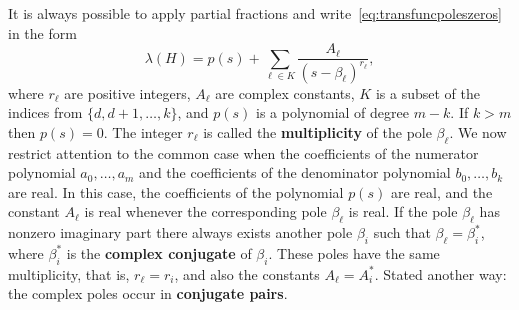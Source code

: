 \documentclass[11pt,a4paper]{book}
\theoremstyle{plain}
\numberwithin{equation}{section}
\newcommand{\term}{\textbf}
\begin{document}
It is always possible to apply partial fractions and write~\eqref{eq:transfuncpoleszeros} in the form
\[
\lambda(H) = p(s) + \sum_{\ell \in K} \frac{A_\ell}{(s - \beta_\ell)^{r_\ell}},
\]
where $r_\ell$ are positive integers, $A_\ell$ are complex constants, $K$ is a subset of the indices from $\{d,d+1,\dots,k\}$, and $p(s)$ is a polynomial of degree $m-k$.  If $k > m$ then $p(s) = 0$.  The integer $r_\ell$ is called the \term{multiplicity} of the pole $\beta_\ell$.  We now restrict attention to the common case when the coefficients of the numerator polynomial $a_0,\dots,a_m$ and the coefficients of the denominator polynomial $b_0,\dots,b_k$ are real.  In this case, the coefficients of the polynomial $p(s)$ are real, and the constant $A_\ell$ is real whenever the corresponding pole $\beta_\ell$ is real.  If the pole $\beta_\ell$ has nonzero imaginary part there always exists another pole $\beta_i$ such that $\beta_\ell = \beta_i^*$, where $\beta_i^*$ is the \term{complex conjugate} of $\beta_i$.  These poles have the same multiplicity, that is, $r_\ell = r_i$, and also the constants $A_\ell = A_i^*$.  Stated another way: the complex poles occur in \term{conjugate pairs}.
\end{document}
